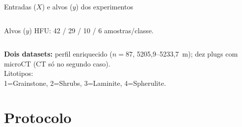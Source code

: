 \documentclass[aspectratio=169,10pt]{beamer}
\begin{document}
\begin{frame}{Entradas ($X$) e alvos ($y$) dos experimentos}
\begin{columns}[T,onlytextwidth]
\begin{block}{Alvos ($y$)}
      {\scriptsize HFU: 42 / 29 / 10 / 6 amostras/classe.}
    \end{block}
  \end{columns}
  \vspace{0.06cm}
  {\scriptsize
  \textbf{Dois datasets:} perfil enriquecido ($n=87$, 5205,9--5233,7~m);
  dez plugs com microCT (CT só no segundo caso).\\
  Litotipos:\\
  1=Grainstone, 2=Shrubs, 3=Laminite, 4=Spherulite.}
\end{frame}

\section{Protocolo}
\end{document}
